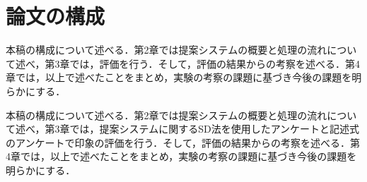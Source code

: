 \section{論文の構成}
本稿の構成について述べる．第2章では提案システムの概要と処理の流れについて述べ，第3章では，評価を行う．そして，評価の結果からの考察を述べる．第4章では，以上で述べたことをまとめ，実験の考察の課題に基づき今後の課題を明らかにする．

本稿の構成について述べる．第2章では提案システムの概要と処理の流れについて述べ，第3章では，提案システムに関するSD法を使用したアンケートと記述式のアンケートで印象の評価を行う．そして，評価の結果からの考察を述べる．第4章では，以上で述べたことをまとめ，実験の考察の課題に基づき今後の課題を明らかにする．
\fi

